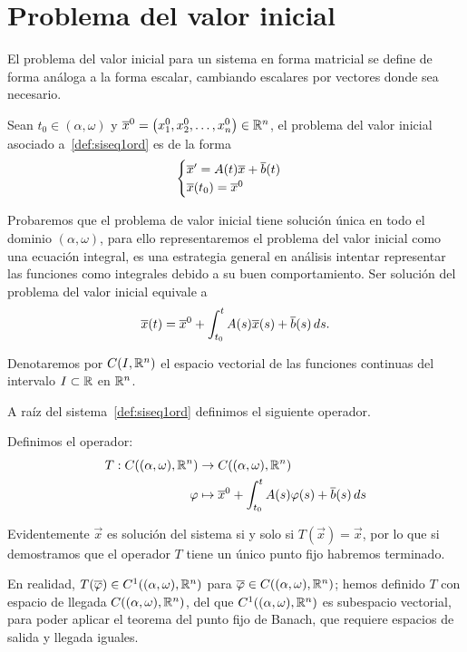 \documentclass[../ecuaciones_diferenciales.tex]{subfiles}
\begin{document}
\section{Problema del valor inicial}

El problema del valor inicial para un sistema en forma matricial se define de
forma análoga a la forma escalar, cambiando escalares por vectores donde sea
necesario.

\begin{definition}
	Sean \(t_0 \in (\alpha, \omega)\) y
	\(\overline{x}^0 = \begin{pmatrix}x^0_1, x^0_2, \dots, x^0_n\end{pmatrix} \in \mathbb{R}^n\), 
	el problema del valor inicial asociado a~\ref{def:siseq1ord} es de la forma
	\[\begin{cases}
		\overline{x}' = A(t)\overline{x} + \overline{b}(t) \\
		\overline{x}(t_0) = \overline{x}^0\end{cases}\]
\end{definition}

Probaremos que el problema de valor inicial tiene solución única en todo el
dominio \((\alpha, \omega)\), para ello representaremos el problema del valor
inicial como una ecuación integral, es una estrategia general en análisis
intentar representar las funciones como integrales debido a su buen
comportamiento. Ser solución del problema del valor inicial equivale a
\[\overline{x}(t) = \overline{x}^0 + \int_{t_0}^t A(s)\overline{x}(s) + \overline{b}(s) \mathop{d\!} s.\]

\begin{notation}
	Denotaremos por \(C(I, \mathbb{R}^n)\) el espacio vectorial de las funciones 
	continuas del intervalo \(I \subset \mathbb{R}\) en \(\mathbb{R}^n\).
\end{notation}

A raíz del sistema~\ref{def:siseq1ord} definimos el siguiente operador.

\begin{definition}[Operador \(T\)]
	Definimos el operador:
	\begin{align*}
		T : C((\alpha, \omega), \mathbb{R}^n) & \to C((\alpha, \omega), \mathbb{R}^n) \\
		\varphi                          & \mapsto 
			\overline{x}^0 + \int_{t_0}^t A(s) \varphi(s) + \overline{b}(s) \mathop{d\!} s
	\end{align*}
\end{definition}

Evidentemente \(\vec{x}\) es solución del sistema si y solo si 
\(T(\vec{x}) = \vec{x}\), por lo que si demostramos que el operador \(T\) 
tiene un único punto fijo habremos terminado.

\begin{remark}
	En realidad, \(T(\overline{\varphi}) \in C^1((\alpha, \omega), \mathbb{R}^n)\) para
	\(\overline{\varphi} \in C((\alpha, \omega), \mathbb{R}^n)\); 
	hemos definido \(T\) con espacio de
	llegada \(C((\alpha, \omega), \mathbb{R}^n)\), del que 
	\(C^1((\alpha, \omega), \mathbb{R}^n)\) es subespacio vectorial, 
	para poder aplicar el teorema del punto fijo de
	Banach, que requiere espacios de salida y llegada iguales.
\end{remark}
\end{document}
